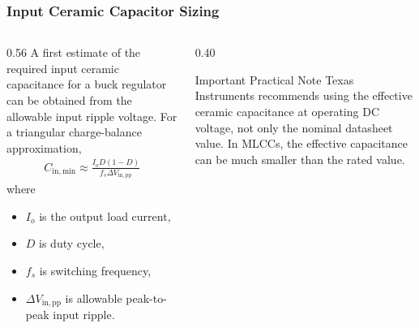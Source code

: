 \begin{frame}
\frametitle{Input Ceramic Capacitor Sizing}

\begin{columns}
\begin{column}{0.56\textwidth}
A first estimate of the required input ceramic capacitance for a buck regulator can be obtained from the allowable input ripple voltage. For a triangular charge-balance approximation,
\begin{align}
    C_{\mathrm{in,min}}
    \approx
    \frac{I_oD(1-D)}
    {f_s\Delta V_{\mathrm{in,pp}}}
\end{align}
where
\begin{itemize}
    \item \(I_o\) is the output load current,
    \item \(D\) is duty cycle,
    \item \(f_s\) is switching frequency,
    \item \(\Delta V_{\mathrm{in,pp}}\) is allowable peak-to-peak input ripple.
\end{itemize}
\end{column}

\begin{column}{0.40\textwidth}
\begin{block}{Important Practical Note}
\small
Texas Instruments recommends using the effective ceramic capacitance at operating DC voltage, not only the nominal datasheet value. In MLCCs, the effective capacitance can be much smaller than the rated value.
\end{block}
\end{column}
\end{columns}

\end{frame}


